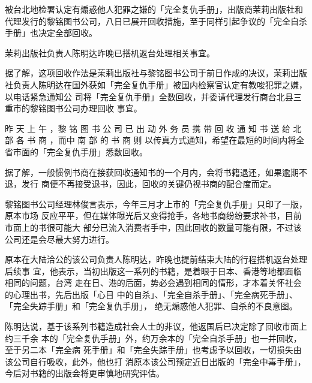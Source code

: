 \documentclass[UTF8]{ctexart}
\begin{document}
被台北地检署认定有煽惑他人犯罪之嫌的「完全复仇手册」，出版商茉莉出版社和代理发行的黎铭图书公司，八日已展开回收措施，至于同样引起争议的「完全自杀手册」也决定全部回收。

茉莉出版社负责人陈明达昨晚已搭机返台处理相关事宜。

据了解，这项回收作法是茉莉出版社与黎铭图书公司于前日作成的决议，茉莉出版社负责人陈明达在国外获如「完全复仇手册」被国内检察官认定有教唆犯罪之嫌，以电话紧急通知公 司将「完全复仇手册」全数回收，并委请代理发行商台北县三重市的黎铭图书公司办理回收 事宜。

昨 天 上 午 ，黎 铭 图 书 公 司 已 出 动 外 务 员 携 带 回 收 通 知 书 送 给 北 部 各 书 商 ，而中 南 部 的 书 商 则 以传真方式通知，希望在最短的时间内将全省市面的「完全复仇手册」悉数回收。

据了解，一般惯例书商在接获回收通知书的一个月内，会将书籍退还，如果逾期不退，发行
商便不再接受退书，因此，回收的关键仍视书商的配合度而定。

黎铭图书公司经理林俊言表示，今年三月才上市的「完全复仇手册」只印了一版，原本市场
反应平平，但在媒体曝光后又变得抢手，各地书商纷纷要求补书，目前市面上的书很可能大
部分已流入消费者手中，因此回收的数量可能有限，不过该公司还是会尽最大努力进行。

原本在大陆洽公的该公司负责人陈明达，昨晚也提前结束大陆的行程搭机返台处理后续事 宜，他表示，当初出版这一系列的书籍，是着眼于日本、香港等地都面临相同的问题，台湾 走在日、港的后面，势必会遇到相同的情形，才本着关怀社会的心理出书，先后出版「心目 中的自杀」、「完全自杀手册」、「完全病死手册」、「完全失踪手册」和「完全复仇手册」， 绝无煽惑他人犯罪、自杀的不良意图。

陈明达说，基于该系列书籍造成社会人士的非议，他返国后已决定除了回收市面上约三千余 本的「完全复仇手册」外，约万余本的「完全自杀手册」也一并回收，至于另二本「完全病 死手册」和「完全失踪手册」也考虑予以回收，一切损失由该公司自行吸收，此外，他也打 消原本该公司预定近日出版的「完全中毒手册」，今后对书籍的出版会将更审慎地研究评估。
\end{document}
